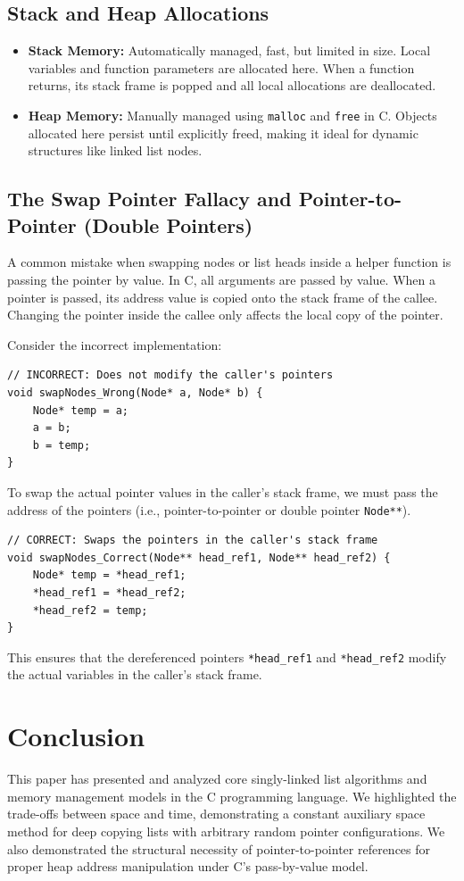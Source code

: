 \documentclass[10pt,journal,compsoc]{IEEEtran}
\begin{document}
\subsection{Stack and Heap Allocations}
\begin{itemize}
    \item \textbf{Stack Memory:} Automatically managed, fast, but limited in size. Local variables and function parameters are allocated here. When a function returns, its stack frame is popped and all local allocations are deallocated.
    \item \textbf{Heap Memory:} Manually managed using \texttt{malloc} and \texttt{free} in C. Objects allocated here persist until explicitly freed, making it ideal for dynamic structures like linked list nodes.
\end{itemize}

\subsection{The Swap Pointer Fallacy and Pointer-to-Pointer (Double Pointers)}
A common mistake when swapping nodes or list heads inside a helper function is passing the pointer by value. In C, all arguments are passed by value. When a pointer is passed, its address value is copied onto the stack frame of the callee. Changing the pointer inside the callee only affects the local copy of the pointer.

Consider the incorrect implementation:
\begin{verbatim}
// INCORRECT: Does not modify the caller's pointers
void swapNodes_Wrong(Node* a, Node* b) {
    Node* temp = a;
    a = b;
    b = temp;
}
\end{verbatim}

To swap the actual pointer values in the caller's stack frame, we must pass the address of the pointers (i.e., pointer-to-pointer or double pointer \texttt{Node**}).

\begin{verbatim}
// CORRECT: Swaps the pointers in the caller's stack frame
void swapNodes_Correct(Node** head_ref1, Node** head_ref2) {
    Node* temp = *head_ref1;
    *head_ref1 = *head_ref2;
    *head_ref2 = temp;
}
\end{verbatim}

This ensures that the dereferenced pointers \texttt{*head\_ref1} and \texttt{*head\_ref2} modify the actual variables in the caller's stack frame.

\section{Conclusion}
This paper has presented and analyzed core singly-linked list algorithms and memory management models in the C programming language. We highlighted the trade-offs between space and time, demonstrating a constant auxiliary space method for deep copying lists with arbitrary random pointer configurations. We also demonstrated the structural necessity of pointer-to-pointer references for proper heap address manipulation under C's pass-by-value model.
\end{document}
